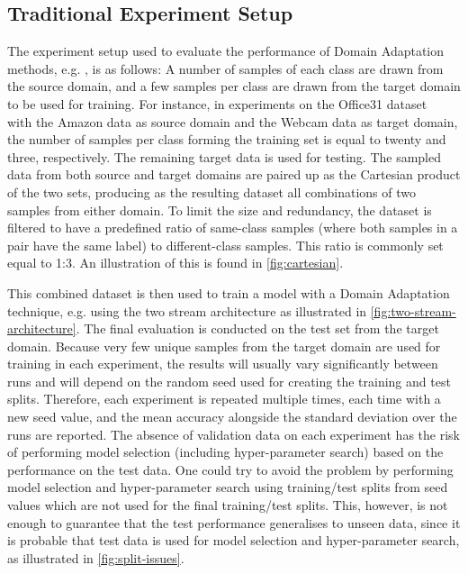 \documentclass[journal]{IEEEtran}
\begin{document}
\subsection{Traditional Experiment Setup}\label{sec:traditional-experimental-setup}
The experiment setup used to evaluate the performance of Domain Adaptation methods, e.g. \cite{motiian2017ccsa,xu2019dsne}, is as follows: A number of samples of each class are drawn from the source domain, and a few samples per class are drawn from the target domain to be used for training. For instance, in experiments on the Office31 dataset~\cite{saenko2010adapting} with the Amazon data as source domain and the Webcam data as target domain, the number of samples per class forming the training set is equal to twenty and three, respectively. The remaining target data is used for testing.
The sampled data from both source and target domains are paired up as the Cartesian product of the two sets, producing as the resulting dataset all combinations of two samples from either domain. To limit the size and redundancy, the dataset is filtered to have a predefined ratio of same-class samples (where both samples in a pair have the same label) to different-class samples. This ratio is commonly set equal to 1:3. An illustration of this is found in \cref{fig:cartesian}.


This combined dataset is then used to train a model with a Domain Adaptation technique, e.g. using the two stream architecture as illustrated in \cref{fig:two-stream-architecture}. The final evaluation is conducted on the test set from the target domain. 
Because very few unique samples from the target domain are used for training in each experiment, the results will usually vary significantly between runs and will depend on the random seed used for creating the training and test splits. Therefore, each experiment is repeated multiple times, each time with a new seed value, and the mean accuracy alongside the standard deviation over the runs are reported. The absence of validation data on each experiment has the risk of performing model selection (including hyper-parameter search) based on the performance on the test data. 
One could try to avoid the problem by performing model selection and hyper-parameter search using training/test splits from seed values which are not used for the final training/test splits. This, however, is not enough to guarantee that the test performance generalises to unseen data, since it is probable that test data is used for model selection and hyper-parameter search, as illustrated in \cref{fig:split-issues}. 
\end{document}
